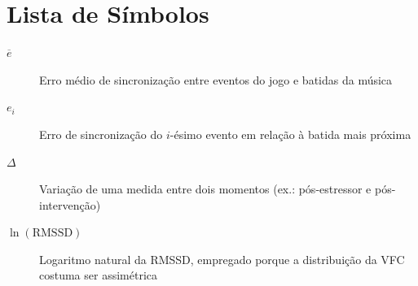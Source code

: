 \chapter*{Lista de Símbolos}


\begin{description}
    \item[$\overline{e}$] Erro médio de sincronização entre eventos do jogo e batidas da música
    \item[$e_i$] Erro de sincronização do $i$-ésimo evento em relação à batida mais próxima
    \item[$\Delta$] Variação de uma medida entre dois momentos (ex.: pós-estressor e pós-intervenção)
    \item[$\ln(\mathrm{RMSSD})$] Logaritmo natural da RMSSD, empregado porque a distribuição da VFC costuma ser assimétrica
\end{description}
